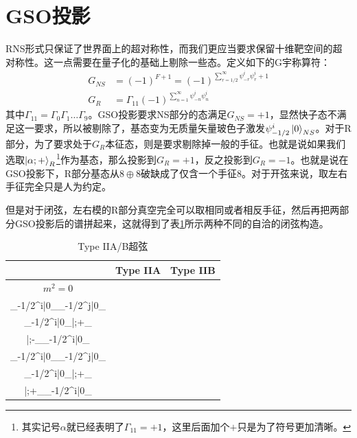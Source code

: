 \section{GSO投影}
RNS形式只保证了世界面上的超对称性，而我们更应当要求保留十维靶空间的超对称性。这一点需要在量子化的基础上剔除一些态。定义如下的G宇称算符：
\begin{equation}
\begin{aligned}
		G_{NS}&=(-1)^{F+1}=(-1)^{\sum_{r=1/2}^\infty \psi_{-r}^i\psi_r^i+1}\\
	G_R&=\Gamma_{11}(-1)^{\sum_{n=1}^\infty \psi_{-n}^i\psi_n^i}
\end{aligned}
\end{equation}
其中$\Gamma_{11}=\Gamma_{0}\Gamma_{1}\ldots\Gamma_{9}$。GSO投影要求NS部分的态满足$G_{NS}=+1$，显然快子态不满足这一要求，所以被剔除了，基态变为无质量矢量玻色子激发$\psi^i_{-1/2}\ket{0}_{NS}$。对于R部分，为了要求处于$G_R$本征态，则是要求剔除掉一般的手征。也就是说如果我们选取$\ket{\alpha;+}_R$\footnote{其实记号$\alpha$就已经表明了$\Gamma_{11}=+1$，这里后面加个$+$只是为了符号更加清晰。}作为基态，那么投影到$G_R=+1$，反之投影到$G_R=-1$。也就是说在GSO投影下，R部分基态从$8\oplus 8$破缺成了仅含一个手征$8$。对于开弦来说，取左右手征完全只是人为约定。

但是对于闭弦，左右模的R部分真空完全可以取相同或者相反手征，然后再把两部分GSO投影后的谱拼起来，这就得到了表\ref{tab:2}所示两种不同的自洽的闭弦构造。
\begin{table}[htbp]
	\centering
	\begin{tabular}{c|cc}
		\hline
		 &Type IIA &Type IIB\\
		 \hline
		$m^2=0$ 
		&\(\displaystyle
			\begin{gathered}
				|\dot\alpha;-\rangle_{\mathrm{R}}\otimes|\alpha;+\rangle_{\mathrm{R}}\\\tilde{\psi}_{-1/2}^i|0\rangle_{\mathrm{NS}}\otimes \psi_{-1/2}^j|0\rangle_{\mathrm{NS}}\\\tilde{\psi}_{-1/2}^i|0\rangle_{\mathrm{NS}}\otimes|\alpha;+\rangle_{\mathrm{R}}\\|\dot\alpha;-\rangle_{\mathrm{R}}\otimes \psi_{-1/2}^i|0\rangle_{\mathrm{NS}}
			\end{gathered}
		\)
		&\(\displaystyle
		\begin{gathered}
			|\alpha;+\rangle_{\mathrm{R}}\otimes|\alpha;+\rangle_{\mathrm{R}}\\\tilde{\psi}_{-1/2}^i|0\rangle_{\mathrm{NS}}\otimes \psi_{-1/2}^j|0\rangle_{\mathrm{NS}}\\\tilde{\psi}_{-1/2}^i|0\rangle_{\mathrm{NS}}\otimes|\alpha;+\rangle_{\mathrm{R}}\\|\alpha;+\rangle_{\mathrm{R}}\otimes \psi_{-1/2}^i|0\rangle_{\mathrm{NS}}
		\end{gathered}
		\)\\
		\hline
	\end{tabular}
	\caption{Type IIA/B超弦}
	\label{tab:2}
\end{table}

